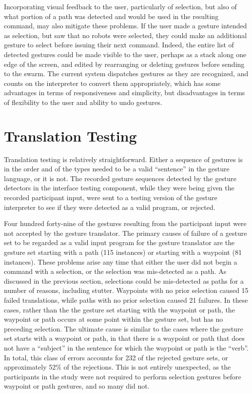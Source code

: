 Incorporating visual feedback to the user, particularly of selection, but also of what portion of a path was detected and would be used in the resulting command, may also mitigate these problems. 
If the user made a gesture intended as selection, but saw that no robots were selected, they could make an additional gesture to select before issuing their next command. 
Indeed, the entire list of detected gestures could be made visible to the user, perhaps as a stack along one edge of the screen, and edited by rearranging or deleting gestures before sending to the swarm. 
The current system dispatches gestures as they are recognized, and counts on the interpreter to convert them appropriately, which has some advantages in terms of responsiveness and simplicity, but disadvantages in terms of flexibility to the user and ability to undo gestures. 

\section{Translation Testing}

Translation testing is relatively straightforward. 
Either a sequence of gestures is in the order and of the types needed to be a valid ``sentence'' in the gesture language, or it is not. 
The recorded gesture sequences detected by the gesture detectors in the interface testing component, while they were being given the recorded participant input, were sent to a testing version of the gesture interpreter to see if they were detected as a valid program, or rejected. 

Four hundred forty-nine of the gestures resulting from the participant input were not accepted by the gesture translator. 
The primary causes of failure of a gesture set to be regarded as a valid input program for the gesture translator are the gesture set starting with a path (115 instances) or starting with a waypoint (81 instances). 
These problems arise any time that either the user did not begin a command with a selection, or the selection was mis-detected as a path. 
As discussed in the previous section, selections could be mis-detected as paths for a number of reasons, including stutter. 
Waypoints with no prior selection caused 15 failed translations, while paths with no prior selection caused 21 failures. 
In these cases, rather than the the gesture set starting with the waypoint or path, the waypoint or path occurs at some point within the gesture set, but has no preceding selection. 
The ultimate cause is similar to the cases where the gesture set starts with a waypoint or path, in that there is a waypoint or path that does not have a ``subject'' in the sentence for which the waypoint or path is the ``verb''.
In total, this class of errors accounts for 232 of the rejected gesture sets, or approximately 52\% of the rejections. 
This is not entirely unexpected, as the participants in the study were not required to perform selection gestures before waypoint or path gestures, and so many did not. 

